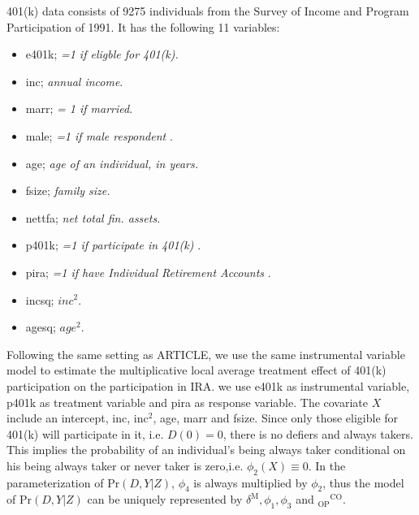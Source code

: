 \documentclass{article}
\begin{document}
401(k) data consists of 9275 individuals from the Survey of Income and Program Participation of 1991. It has the following 11 variables:
\begin{itemize}
  \item  e401k; {\it =1 if eligble for 401(k).}
  \item inc;  {\it annual income}.
  \item marr;  {\it = 1 if married}.
  \item male; {\it=1 if male respondent }.
  \item age; {\it age of an individual, in years.}
  \item fsize; {\it family size.  }
  \item nettfa; {\it net total fin. assets}.
  \item p401k; {\it =1 if participate in 401(k) }.
  \item pira; {\it =1 if have Individual Retirement Accounts }.
 \item incsq;  {\it $inc^2$}.
 \item agesq;  {\it $age^2$}.
\end{itemize}


Following the same setting as ARTICLE, we use the same instrumental variable model to estimate the multiplicative local average treatment effect of 401(k) participation on the participation in IRA. we use e401k as instrumental variable, p401k as treatment variable and pira as response variable. The covariate $X$ include an intercept, inc, $\mathrm{inc}^2$, age, marr and fsize. 
Since only those eligible for 401(k) will participate in it, i.e. $D(0) = 0$, there is no defiers and always takers. This implies the probability of an individual's being always taker conditional on his being always taker or never taker is zero,i.e. $\phi_2(X) \equiv 0$. In the parameterization of $\mathrm{Pr}(D, Y| Z)$, $\phi_4$ is always multiplied by $\phi_2$, thus the model of $\mathrm{Pr}(D, Y| Z)$ can be uniquely represented by $\delta^\mathrm{M}, \phi_1, \phi_3$ and ${ }_{\mathrm{OP}}{ }^{\mathrm{CO}}$.
\end{document}
